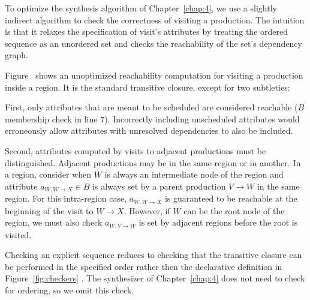 To optimize the synthesis algorithm of Chapter~\ref{chap:4}, we use a slightly indirect algorithm to check the correctness of visiting a production.  The intuition is that it relaxes the specification of visit's attributes by treating the ordered sequence as an unordered set and checks the reachability of the set's dependency graph. 

Figure~ shows an unoptimized reachability computation for visiting a production inside a  region. It is the standard transitive closure, except for two subtleties:

First, only attributes that are meant to be scheduled are considered reachable ($B$ membership check in line 7). Incorrectly including unscheduled attributes would erroneously allow attributes with unresolved dependencies to also be included.  

Second, attributes computed by visits to adjacent productions must be distinguished. Adjacent productions may be in the same region or in another. In a  region, consider when $W$ is always an intermediate node of the region and attribute $a_{W,W{\rightarrow}X} \in B$ is always set by a parent production $V{\rightarrow}W$ in the same region. For this intra-region case, $a_{W,W{\rightarrow}X}$ is guaranteed to be reachable at the beginning of the visit to $W{\rightarrow}X$.  However, if $W$ can be the root node of the region, we must also check $a_{W,V{\rightarrow}W}$ is set by adjacent regions before the root is visited. %


Checking an explicit sequence reduces to checking that the transitive closure can be performed in the specified order rather then the declarative definition in Figure~\ref{fig:checkers} . The synthesizer of Chapter~\ref{chap:4} does not need to check for ordering, so we omit this check.


